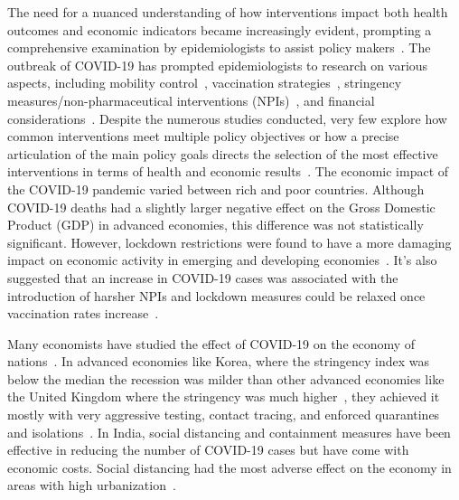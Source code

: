 \documentclass[tikz,fleqn,12pt]{wlscirep}
\begin{document}
The need for a nuanced understanding of how interventions impact both health outcomes and economic indicators became increasingly evident, prompting a comprehensive examination by epidemiologists to assist policy makers~\cite{Anderson2020}. The outbreak of COVID-19 has prompted epidemiologists to research on various aspects, including mobility control~\cite{Song2022, Chinazzi2020}, vaccination strategies~\cite{Nguyen2021, Kim2022}, stringency measures/non-pharmaceutical interventions (NPIs)~\cite{Jalloh2022, Caldwell2021, Ferguson2020}, and financial considerations~\cite{DeFoo2023}. Despite the numerous studies conducted, very few explore how common interventions meet multiple policy objectives or how a precise articulation of the main policy goals directs the selection of the most effective interventions in terms of health and economic results~\cite{Hollingsworth2011, Song2022, Pangallo2023, Ash2022, Ohi2020, PADMANABHAN2021102676}. The economic impact of the COVID-19 pandemic varied between rich and poor countries. Although COVID-19 deaths had a slightly larger negative effect on the Gross Domestic Product (GDP) in advanced economies, this difference was not statistically significant. However, lockdown restrictions were found to have a more damaging impact on economic activity in emerging and developing economies~\cite{Gagnon2023, Redlin2022,Liang2021}. It's also suggested that an increase in COVID-19 cases was associated with the introduction of harsher NPIs and lockdown measures could be relaxed once vaccination rates increase~\cite{Redlin2022, Patel2021}.

Many economists have studied the effect of COVID-19 on the economy of nations~\cite{Gagnon2023, GagnonKorea, Deb2020,Eichenbaum2021}. In advanced economies like Korea, where the stringency index was below the median the recession was milder than other advanced economies like the United Kingdom where the stringency was much higher~\cite{GagnonKorea}, they achieved it mostly with very aggressive testing, contact tracing, and enforced quarantines and isolations~\cite{Lim2023, KoreaMinister}. In India, social distancing and containment measures have been effective in reducing the number of COVID-19 cases but have come with economic costs. Social distancing had the most adverse effect on the economy in areas with high urbanization~\cite{Deb2020}.
\end{document}
